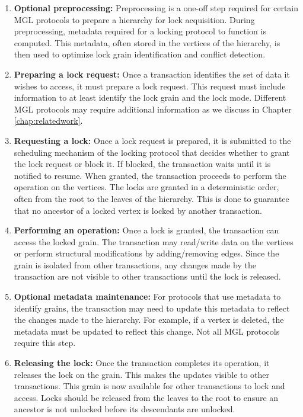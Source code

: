 \begin{enumerate}
    \item \textbf{Optional preprocessing:} Preprocessing is a one-off step required for certain MGL protocols to prepare a hierarchy for lock acquisition. During preprocessing, metadata required for a locking protocol to function is computed. This metadata, often stored in the vertices of the hierarchy, is then used to optimize lock grain identification and conflict detection. 
    \item \textbf{Preparing a lock request:} Once a transaction identifies the set of data it wishes to access, it must prepare a lock request. This request must include information to at least identify the lock grain and the lock mode. Different MGL protocols may require additional information as we discuss in Chapter \ref{chap:relatedwork}.
    \item \textbf{Requesting a lock:} Once a lock request is prepared, it is submitted to the scheduling mechanism of the locking protocol that decides whether to grant the lock request or block it. If blocked, the transaction waits until it is notified to resume. When granted, the transaction proceeds to perform the operation on the vertices. The locks are granted in a deterministic order, often from the root to the leaves of the hierarchy. This is done to guarantee that no ancestor of a locked vertex is locked by another transaction. 
    \item \textbf{Performing an operation:} Once a lock is granted, the transaction can access the locked grain. The transaction may read/write data on the vertices or perform structural modifications by adding/removing edges. Since the grain is isolated from other transactions, any changes made by the transaction are not visible to other transactions until the lock is released.
    \item \textbf{Optional metadata maintenance:} For protocols that use metadata to identify grains, the transaction may need to update this metadata to reflect the changes made to the hierarchy. For example, if a vertex is deleted, the metadata must be updated to reflect this change. Not all MGL protocols require this step.
    \item \textbf{Releasing the lock:} Once the transaction completes its operation, it releases the lock on the grain. This makes the updates visible to other transactions. This grain is now available for other transactions to lock and access. Locks should be released from the leaves to the root to ensure an ancestor is not unlocked before its descendants are unlocked.
\end{enumerate}



